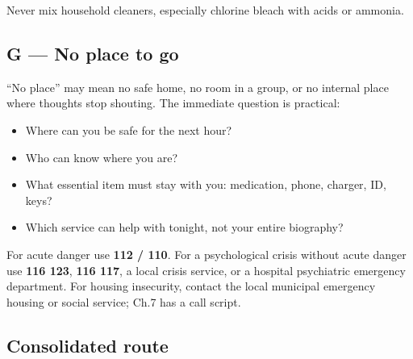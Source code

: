 Never mix household cleaners, especially chlorine bleach with acids or
ammonia.

\hypertarget{g-no-place-to-go}{%
\subsection{G --- No place to go}\label{g-no-place-to-go}}

``No place'' may mean no safe home, no room in a group, or no internal
place where thoughts stop shouting. The immediate question is practical:

\begin{itemize}
\tightlist
\item
  Where can you be safe for the next hour?
\item
  Who can know where you are?
\item
  What essential item must stay with you: medication, phone, charger,
  ID, keys?
\item
  Which service can help with tonight, not your entire biography?
\end{itemize}

For acute danger use \textbf{112 / 110}. For a psychological crisis
without acute danger use \textbf{116 123}, \textbf{116 117}, a local
crisis service, or a hospital psychiatric emergency department. For
housing insecurity, contact the local municipal emergency housing or
social service; Ch.7 has a call script.

\hypertarget{consolidated-route}{%
\subsection{Consolidated route}\label{consolidated-route}}

